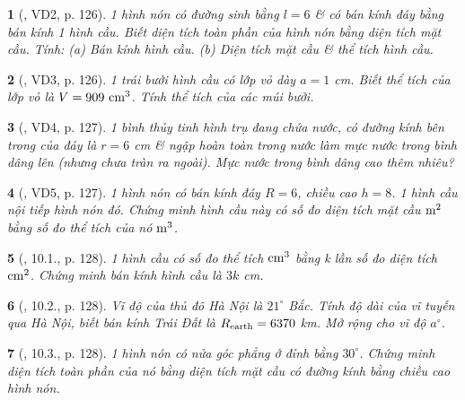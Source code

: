 \documentclass{article}
\newtheorem{baitoan}{}
\begin{document}
\begin{baitoan}[\cite{Binh_boi_duong_Toan_9_tap_2}, VD2, p. 126]
	1 hình nón có đường sinh bằng $l = 6$ \& có bán kính đáy bằng bán kính 1 hình cầu. Biết diện tích toàn phần của hình nón bằng diện tích mặt cầu. Tính: (a) Bán kính hình cầu. (b) Diện tích mặt cầu \& thể tích hình cầu.
\end{baitoan}

\begin{baitoan}[\cite{Binh_boi_duong_Toan_9_tap_2}, VD3, p. 126]
	1 trái bưởi hình cầu có lớp vỏ dày $a = 1$ {\rm cm}. Biết thể tích của lớp vỏ là $V = 909\ {\rm cm}^3$. Tính thể tích của các múi bưởi.
\end{baitoan}

\begin{baitoan}[\cite{Binh_boi_duong_Toan_9_tap_2}, VD4, p. 127]
	1 bình thủy tinh hình trụ đang chứa nước, có đường kính bên trong của đáy là $r = 6$ {\rm cm} \& ngập hoàn toàn trong nước làm mực nước trong bình dâng lên (nhưng chưa tràn ra ngoài). Mực nước trong bình dâng cao thêm nhiêu?
\end{baitoan}

\begin{baitoan}[\cite{Binh_boi_duong_Toan_9_tap_2}, VD5, p. 127]
	1 hình nón có bán kính đáy $R = 6$, chiều cao $h = 8$. 1 hình cầu nội tiếp hình nón đó. Chứng minh hình cầu này có số đo diện tích mặt cầu $\rm m^2$ bằng số đo thể tích của nó $\rm m^3$.
\end{baitoan}

\begin{baitoan}[\cite{Binh_boi_duong_Toan_9_tap_2}, 10.1., p. 128]
	1 hình cầu có số đo thể tích $\rm cm^3$ bằng k lần số đo diện tích $\rm cm^2$. Chứng minh bán kính hình cầu là $3k$ {\rm cm}.
\end{baitoan}

\begin{baitoan}[\cite{Binh_boi_duong_Toan_9_tap_2}, 10.2., p. 128]
	Vĩ độ của thủ đô Hà Nội là $21^\circ$ Bắc. Tính độ dài của vĩ tuyến qua Hà Nội, biết bán kính Trái Đất là $R_{\rm earth} = 6370$ {\rm km}. Mở rộng cho vĩ độ $a^\circ$.
\end{baitoan}

\begin{baitoan}[\cite{Binh_boi_duong_Toan_9_tap_2}, 10.3., p. 128]
	1 hình nón có nửa góc phẳng ở đỉnh bằng $30^\circ$. Chứng minh diện tích toàn phần của nó bằng diện tích mặt cầu có đường kính bằng chiều cao hình nón.
\end{baitoan}
\end{document}
